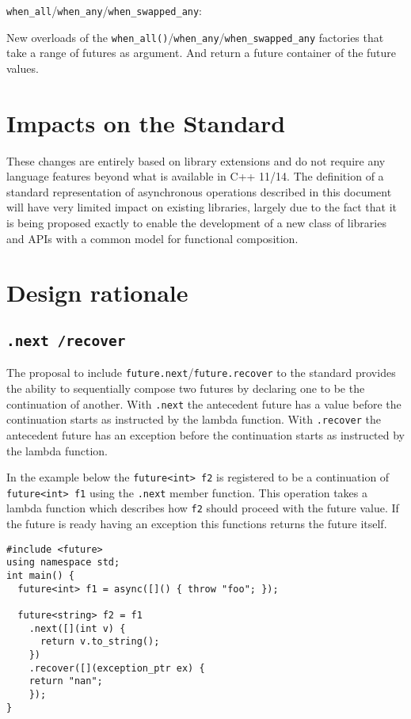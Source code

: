 \documentclass[a4paper,10pt]{article}
\newcommand{\cpp}[1]{\lstinline{#1}}
\newcommand{\update}[1]{\colorbox{update_color}{#1}}
\begin{document}
\cpp{when_all}\update{/\cpp{when_any}/\cpp{when_swapped_any}}:

New overloads of the \cpp{when_all()}\update{/\cpp{when_any}/\cpp{when_swapped_any}} factories that take a range of futures as argument. And return a future container of the future values.

\section{Impacts on the Standard}

These changes are entirely based on library extensions and do not require any language features beyond what is available in C++ 11/14. The definition of a standard representation of asynchronous operations described in this document will have very limited impact on existing libraries, largely due to the fact that it is being proposed exactly to enable the development of a new class of libraries and APIs with a common model for functional composition. 

\section{Design rationale}

\subsection{\cpp{.next /recover}}

The proposal to include \cpp{future.next}/\cpp{future.recover} to the standard provides the ability to sequentially compose two futures by declaring one to be the continuation of another. With \cpp{.next} the antecedent future has a value before the continuation starts as instructed by the lambda function. With \cpp{.recover} the antecedent future has an exception before the continuation starts as instructed by the lambda function.
 
In the example below the \cpp{future<int> f2} is registered to be a continuation of \cpp{future<int> f1} using the \cpp{.next} 
member function. This operation takes a lambda function which describes how \cpp{f2} should proceed with the future value. If the future is ready having an exception this functions returns the future itself.

\begin{lstlisting}[xleftmargin=0pt]
#include <future> 
using namespace std; 
int main() { 
  future<int> f1 = async([]() { throw "foo"; }); 
 
  future<string> f2 = f1
    .next([](int v) { 
      return v.to_string();
    })
    .recover([](exception_ptr ex) {
	return "nan";
    }); 
}
\end{lstlisting}
 
\end{document}
